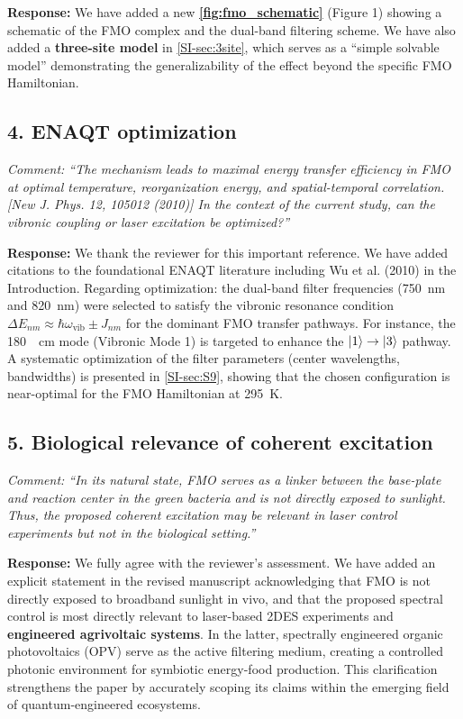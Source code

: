 \documentclass[11pt]{article}
\begin{document}
\textbf{Response:} We have added a new \textbf{\cref{fig:fmo_schematic}} (Figure 1) showing a schematic of the FMO complex and the dual-band filtering scheme. We have also added a \textbf{three-site model} in \cref{SI-sec:3site}, which serves as a ``simple solvable model'' demonstrating the generalizability of the effect beyond the specific FMO Hamiltonian.

\subsection*{4. ENAQT optimization}

\textit{Comment: ``The mechanism leads to maximal energy transfer efficiency in FMO at optimal temperature, reorganization energy, and spatial-temporal correlation. [New J. Phys. 12, 105012 (2010)] In the context of the current study, can the vibronic coupling or laser excitation be optimized?''}

\textbf{Response:} We thank the reviewer for this important reference. We have added citations to the foundational ENAQT literature including Wu et al. (2010) in the Introduction. Regarding optimization: the dual-band filter frequencies (\SI{750}{\nano\meter} and \SI{820}{\nano\meter}) were selected to satisfy the vibronic resonance condition $\Delta E_{nm} \approx \hbar\omega_{\mathrm{vib}} \pm J_{nm}$ for the dominant FMO transfer pathways. For instance, the \SI{180}{\per\centi\meter} mode (Vibronic Mode 1) is targeted to enhance the $\ket{1} \to \ket{3}$ pathway. A systematic optimization of the filter parameters (center wavelengths, bandwidths) is presented in \cref{SI-sec:S9}, showing that the chosen configuration is near-optimal for the FMO Hamiltonian at \SI{295}{\kelvin}.

\subsection*{5. Biological relevance of coherent excitation}

\textit{Comment: ``In its natural state, FMO serves as a linker between the base-plate and reaction center in the green bacteria and is not directly exposed to sunlight. Thus, the proposed coherent excitation may be relevant in laser control experiments but not in the biological setting.''}

\textbf{Response:} We fully agree with the reviewer's assessment. We have added an explicit statement in the revised manuscript acknowledging that FMO is not directly exposed to broadband sunlight in vivo, and that the proposed spectral control is most directly relevant to laser-based 2DES experiments and \textbf{engineered agrivoltaic systems}. In the latter, spectrally engineered organic photovoltaics (OPV) serve as the active filtering medium, creating a controlled photonic environment for symbiotic energy-food production. This clarification strengthens the paper by accurately scoping its claims within the emerging field of quantum-engineered ecosystems.
\end{document}
